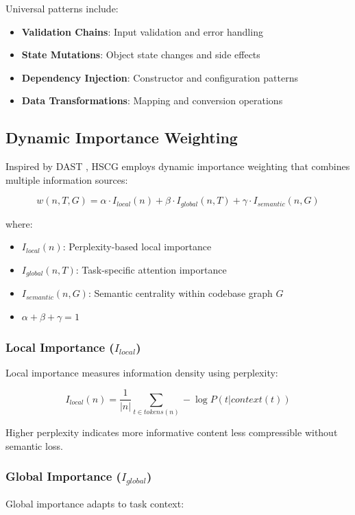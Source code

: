 \documentclass[conference]{IEEEtran}
\begin{document}
Universal patterns include:
\begin{itemize}
    \item \textbf{Validation Chains}: Input validation and error handling
    \item \textbf{State Mutations}: Object state changes and side effects  
    \item \textbf{Dependency Injection}: Constructor and configuration patterns
    \item \textbf{Data Transformations}: Mapping and conversion operations
\end{itemize}

\subsection{Dynamic Importance Weighting}

Inspired by DAST \cite{liu2025dast}, HSCG employs dynamic importance weighting that combines multiple information sources:

\begin{equation}
w(n, T, G) = \alpha \cdot I_{local}(n) + \beta \cdot I_{global}(n, T) + \gamma \cdot I_{semantic}(n, G)
\end{equation}

where:
\begin{itemize}
    \item $I_{local}(n)$: Perplexity-based local importance
    \item $I_{global}(n, T)$: Task-specific attention importance
    \item $I_{semantic}(n, G)$: Semantic centrality within codebase graph $G$
    \item $\alpha + \beta + \gamma = 1$
\end{itemize}

\subsubsection{Local Importance ($I_{local}$)}
Local importance measures information density using perplexity:

\begin{equation}
I_{local}(n) = \frac{1}{|n|} \sum_{t \in tokens(n)} -\log P(t|context(t))
\end{equation}

Higher perplexity indicates more informative content less compressible without semantic loss.

\subsubsection{Global Importance ($I_{global}$)}
Global importance adapts to task context:
\end{document}
